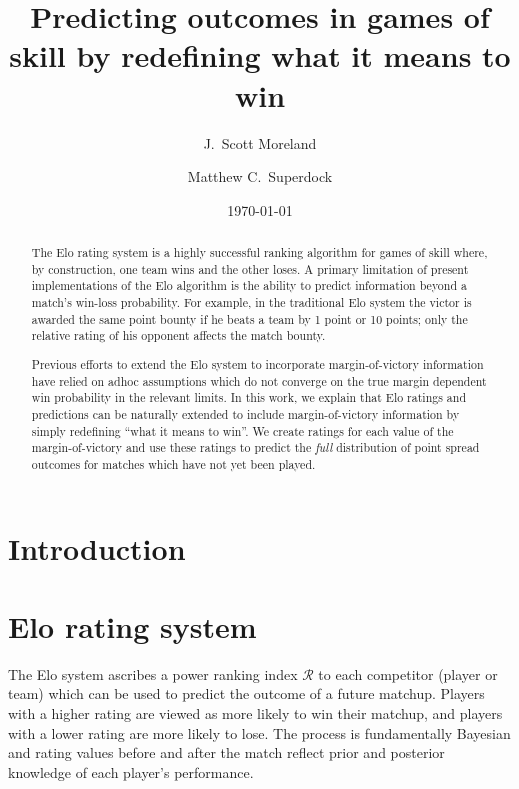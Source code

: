 \documentclass[aps,prc,reprint,amsmath,superscriptaddress]{revtex4-1}
\newcommand{\R}{\mathcal{R}}
\begin{document}
\title{Predicting outcomes in games of skill by redefining what it means to win}

\author{J.\ Scott Moreland}
\author{Matthew C.\ Superdock}

\date{\today}


\begin{abstract}
  The Elo rating system is a highly successful ranking algorithm for games of skill where, by construction, one team wins and the other loses.
  A primary limitation of present implementations of the Elo algorithm is the ability to predict information beyond a match's win-loss probability.
  For example, in the traditional Elo system the victor is awarded the same point bounty if he beats a team by 1 point or 10 points; only the relative rating of his opponent affects the match bounty.

Previous efforts to extend the Elo system to incorporate margin-of-victory information have relied on adhoc assumptions which do not converge on the true margin dependent win probability in the relevant limits.
  In this work, we explain that Elo ratings and predictions can be naturally extended to include margin-of-victory information by simply redefining ``what it means to win''.
  We create ratings for each value of the margin-of-victory and use these ratings to predict the \emph{full} distribution of point spread outcomes for matches which have not yet been played.
\end{abstract}


\maketitle

\section{Introduction}


\section{Elo rating system}

The Elo system ascribes a power ranking index $\R$ to each competitor (player or team) which can be used to predict the outcome of a future matchup.
Players with a higher rating are viewed as more likely to win their matchup, and players with a lower rating are more likely to lose.
The process is fundamentally Bayesian and rating values before and after the match reflect prior and posterior knowledge of each player's performance.
\end{document}

